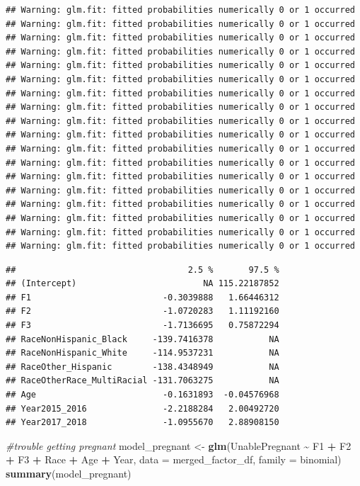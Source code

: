 \documentclass[
]{article}
\newenvironment{Shaded}{\begin{snugshade}}{\end{snugshade}}
\newcommand{\AttributeTok}[1]{\textcolor[rgb]{0.13,0.29,0.53}{#1}}
\newcommand{\CommentTok}[1]{\textcolor[rgb]{0.56,0.35,0.01}{\textit{#1}}}
\newcommand{\FunctionTok}[1]{\textcolor[rgb]{0.13,0.29,0.53}{\textbf{#1}}}
\newcommand{\NormalTok}[1]{#1}
\newcommand{\OtherTok}[1]{\textcolor[rgb]{0.56,0.35,0.01}{#1}}
\newcommand{\SpecialCharTok}[1]{\textcolor[rgb]{0.81,0.36,0.00}{\textbf{#1}}}
\begin{document}
\begin{verbatim}
## Warning: glm.fit: fitted probabilities numerically 0 or 1 occurred
## Warning: glm.fit: fitted probabilities numerically 0 or 1 occurred
## Warning: glm.fit: fitted probabilities numerically 0 or 1 occurred
## Warning: glm.fit: fitted probabilities numerically 0 or 1 occurred
## Warning: glm.fit: fitted probabilities numerically 0 or 1 occurred
## Warning: glm.fit: fitted probabilities numerically 0 or 1 occurred
## Warning: glm.fit: fitted probabilities numerically 0 or 1 occurred
## Warning: glm.fit: fitted probabilities numerically 0 or 1 occurred
## Warning: glm.fit: fitted probabilities numerically 0 or 1 occurred
## Warning: glm.fit: fitted probabilities numerically 0 or 1 occurred
## Warning: glm.fit: fitted probabilities numerically 0 or 1 occurred
## Warning: glm.fit: fitted probabilities numerically 0 or 1 occurred
## Warning: glm.fit: fitted probabilities numerically 0 or 1 occurred
## Warning: glm.fit: fitted probabilities numerically 0 or 1 occurred
## Warning: glm.fit: fitted probabilities numerically 0 or 1 occurred
## Warning: glm.fit: fitted probabilities numerically 0 or 1 occurred
## Warning: glm.fit: fitted probabilities numerically 0 or 1 occurred
## Warning: glm.fit: fitted probabilities numerically 0 or 1 occurred
\end{verbatim}

\begin{verbatim}
##                                  2.5 %       97.5 %
## (Intercept)                         NA 115.22187852
## F1                          -0.3039888   1.66446312
## F2                          -1.0720283   1.11192160
## F3                          -1.7136695   0.75872294
## RaceNonHispanic_Black     -139.7416378           NA
## RaceNonHispanic_White     -114.9537231           NA
## RaceOther_Hispanic        -138.4348949           NA
## RaceOtherRace_MultiRacial -131.7063275           NA
## Age                         -0.1631893  -0.04576968
## Year2015_2016               -2.2188284   2.00492720
## Year2017_2018               -1.0955670   2.88908150
\end{verbatim}

\begin{Shaded}
\begin{Highlighting}[]
\CommentTok{\#trouble getting pregnant}
\NormalTok{model\_pregnant }\OtherTok{\textless{}{-}} \FunctionTok{glm}\NormalTok{(UnablePregnant }\SpecialCharTok{\textasciitilde{}}\NormalTok{ F1 }\SpecialCharTok{+}\NormalTok{ F2 }\SpecialCharTok{+}\NormalTok{ F3 }\SpecialCharTok{+}\NormalTok{ Race }\SpecialCharTok{+}\NormalTok{ Age }\SpecialCharTok{+}\NormalTok{ Year, }\AttributeTok{data =}\NormalTok{ merged\_factor\_df,}
                      \AttributeTok{family =}\NormalTok{ binomial)}
\FunctionTok{summary}\NormalTok{(model\_pregnant)}
\end{Highlighting}
\end{Shaded}
\end{document}
